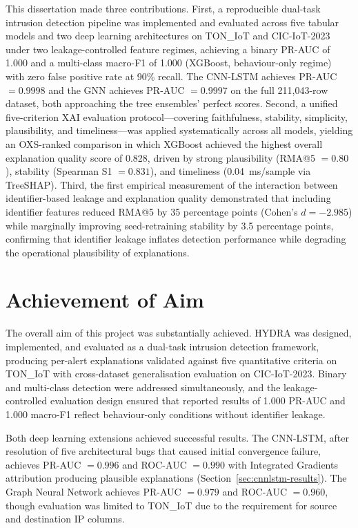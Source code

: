 \documentclass[12pt,a4paper]{report}
\begin{document}
This dissertation made three contributions. First, a reproducible dual-task intrusion detection pipeline was implemented and evaluated across five tabular models and two deep learning architectures on TON\_IoT and CIC-IoT-2023 under two leakage-controlled feature regimes, achieving a binary PR-AUC of 1.000 and a multi-class macro-F1 of 1.000 (XGBoost, behaviour-only regime) with zero false positive rate at 90\% recall. The CNN-LSTM achieves PR-AUC $= 0.9998$ and the GNN achieves PR-AUC $= 0.9997$ on the full 211,043-row dataset, both approaching the tree ensembles' perfect scores. Second, a unified five-criterion XAI evaluation protocol---covering faithfulness, stability, simplicity, plausibility, and timeliness---was applied systematically across all models, yielding an OXS-ranked comparison in which XGBoost achieved the highest overall explanation quality score of 0.828, driven by strong plausibility (RMA@5 $= 0.80$), stability (Spearman S1 $= 0.831$), and timeliness (0.04~ms/sample via TreeSHAP). Third, the first empirical measurement of the interaction between identifier-based leakage and explanation quality demonstrated that including identifier features reduced RMA@5 by 35 percentage points (Cohen's $d = -2.985$) while marginally improving seed-retraining stability by 3.5 percentage points, confirming that identifier leakage inflates detection performance while degrading the operational plausibility of explanations.

\section{Achievement of Aim}
\label{sec:achievement}

The overall aim of this project was substantially achieved. HYDRA was designed, implemented, and evaluated as a dual-task intrusion detection framework, producing per-alert explanations validated against five quantitative criteria on TON\_IoT with cross-dataset generalisation evaluation on CIC-IoT-2023. Binary and multi-class detection were addressed simultaneously, and the leakage-controlled evaluation design ensured that reported results of 1.000 PR-AUC and 1.000 macro-F1 reflect behaviour-only conditions without identifier leakage.

Both deep learning extensions achieved successful results. The CNN-LSTM, after resolution of five architectural bugs that caused initial convergence failure, achieves PR-AUC $= 0.996$ and ROC-AUC $= 0.990$ with Integrated Gradients attribution producing plausible explanations (Section~\ref{sec:cnnlstm-results}). The Graph Neural Network achieves PR-AUC $= 0.979$ and ROC-AUC $= 0.960$, though evaluation was limited to TON\_IoT due to the requirement for source and destination IP columns.
\end{document}
